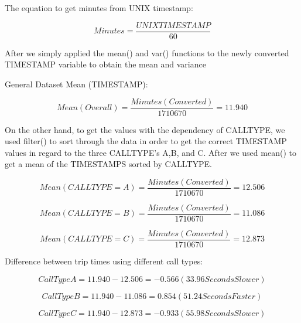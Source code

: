 \documentclass[11pt]{article}
\begin{document}
\par
The equation to get minutes from UNIX timestamp:

\begin{equation}
Minutes = \frac{UNIX TIMESTAMP}{60}
\end{equation}

\par
After we simply applied the mean() and var() functions to the newly converted TIMESTAMP variable to obtain the mean and variance

\par
General Dataset Mean (TIMESTAMP):

\begin{equation}
Mean (Overall) = \frac{Minutes (Converted)}{1710670} = 11.940
\end{equation}

\par
On the other hand, to get the values with the dependency of CALLTYPE, we used filter() to sort through the data in order to get the correct TIMESTAMP values in regard to the three CALLTYPE’s A,B, and C. After we used mean() to get a mean of the TIMESTAMPS sorted by CALLTYPE. 

\begin{equation}
Mean (CALLTYPE = A) = \frac{Minutes (Converted)}{1710670} = 12.506
\end{equation}

\begin{equation}
Mean (CALLTYPE = B) = \frac{Minutes (Converted)}{1710670} = 11.086
\end{equation}

\begin{equation}
Mean (CALLTYPE = C) = \frac{Minutes (Converted)}{1710670} = 12.873
\end{equation}

\par
Difference between trip times using different call types:

\begin{equation}
Call Type A = 11.940 - 12.506 = -0.566 (33.96 Seconds Slower)
\end{equation}

\begin{equation}
Call Type B = 11.940 - 11.086 = 0.854(51.24 Seconds Faster)
\end{equation}

\begin{equation}
Call Type C = 11.940 - 12.873 = -0.933 (55.98 Seconds Slower)
\end{equation}
\end{document}
